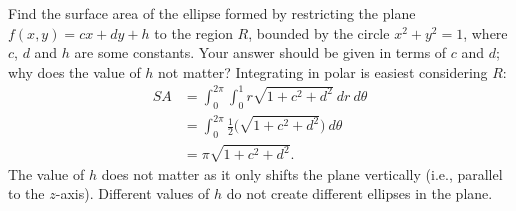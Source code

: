 {Find the surface area of the ellipse formed by restricting the plane $f(x,y) = cx+dy+h$ to the region $R$, bounded by the circle $x^2+y^2=1$, where $c$, $d$ and $h$ are some constants. Your answer should be given in terms of $c$ and $d$; why does the value of $h$ not matter?
}
{Integrating in polar is easiest considering $R$:
\begin{align*}SA &= \int_{0}^{2\pi}\int_{0}^{1} r\sqrt{1+ c^2+d^2}\ dr\ d\theta\\
		&= \int_0^{2\pi}\frac12\Big(\sqrt{1+c^2+d^2}\Big)\ d\theta \\
		&= \pi\sqrt{1+c^2+d^2}.
\end{align*}
The value of $h$ does not matter as it only shifts the plane vertically (i.e., parallel to the $z$-axis). Different values of $h$ do not create different ellipses in the plane.
}